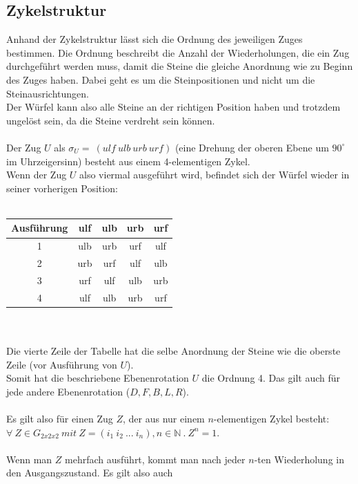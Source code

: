 \documentclass[12pt,a4paper, usenames, dvipsnames]{article}
\begin{document}
\subsection*{Zykelstruktur}


Anhand der Zykelstruktur lässt sich die Ordnung des jeweiligen Zuges bestimmen. Die Ordnung beschreibt die Anzahl der Wiederholungen, die ein Zug durchgeführt werden muss, damit die Steine die gleiche Anordnung wie zu Beginn des Zuges haben. Dabei geht es um die Steinpositionen und nicht um die Steinausrichtungen.\\
Der Würfel kann also alle Steine an der richtigen Position haben und trotzdem ungelöst sein, da die Steine verdreht sein können. \\
\\
Der Zug $U$ als $\sigma_U =\ (ulf \ ulb \ urb \ urf) $ (eine Drehung der oberen Ebene um $90^\circ$ im Uhrzeigersinn) besteht aus einem 4-elementigen Zykel. \\
Wenn der Zug $U$ also viermal ausgeführt wird, befindet sich der Würfel wieder in seiner vorherigen Position: \\ \\
\begin{tabular}{|c||c|c|c|c|}
\hline
Ausführung & ulf & ulb & urb & urf \\
\hline
\hline
1 & ulb & urb & urf & ulf \\
\hline
2 & urb & urf & ulf & ulb \\
\hline
3 & urf & ulf & ulb & urb \\
\hline
4 & ulf & ulb & urb & urf \\
\hline

\end{tabular}
\ \\
\\
Die vierte Zeile der Tabelle hat die selbe Anordnung der Steine wie die oberste Zeile (vor Ausführung von $U$). \\
Somit hat die beschriebene Ebenenrotation $U$ die Ordnung 4. Das gilt auch für jede andere Ebenenrotation ($D, F, B, L, R$).\\
\\
Es gilt also für einen Zug $Z$, der aus nur einem $n$-elementigen Zykel besteht: \\ 
${\forall \ Z \in G_{2x2x2}\ mit \ Z=(i_1 \ i_2 \ ... \ i_n), n \in \mathbb{N} \ . \  Z^n=1 }$. \\
\\
Wenn man $Z$ mehrfach ausführt, kommt man nach jeder $n$-ten Wiederholung in den Ausgangszustand. Es gilt also auch 
\end{document}

